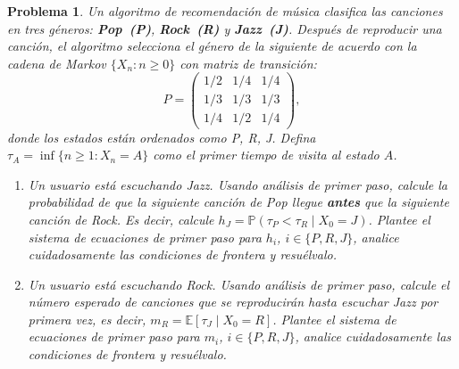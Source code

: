 \documentclass[12pt]{article}
\newtheorem{problem}{Problema}
\begin{document}

\begin{problem}
Un algoritmo de recomendación de música clasifica las canciones en tres géneros:
\textbf{Pop~(P)}, \textbf{Rock~(R)} y \textbf{Jazz~(J)}. Después de reproducir una canción,
el algoritmo selecciona el género de la siguiente de acuerdo con la cadena de Markov
$\{X_n : n \geq 0\}$ con matriz de transición:
\[
P = \begin{pmatrix}
1/2 & 1/4 & 1/4 \\[4pt]
1/3 & 1/3 & 1/3 \\[4pt]
1/4 & 1/2 & 1/4
\end{pmatrix},
\]
donde los estados están ordenados como P, R, J.
Defina $\tau_A = \inf\{n \geq 1 : X_n = A\}$ como el primer tiempo de visita al estado $A$.
\begin{enumerate}
    \item[(a)] Un usuario está escuchando Jazz. Usando análisis de primer paso, calcule la probabilidad
        de que la siguiente canción de Pop llegue \textbf{antes} que la siguiente canción de Rock.
        Es decir, calcule $h_J = \mathbb{P}(\tau_P < \tau_R \mid X_0 = J)$.
        Plantee el sistema de ecuaciones de primer paso para $h_i$, $i \in \{P, R, J\}$, analice cuidadosamente las condiciones de frontera y resuélvalo.

    \item[(b)] Un usuario está escuchando Rock. Usando análisis de primer paso, calcule el número
        esperado de canciones que se reproducirán hasta escuchar Jazz por primera vez,
        es decir, $m_R = \mathbb{E}[\tau_J \mid X_0 = R]$.
        Plantee el sistema de ecuaciones de primer paso para $m_i$, $i \in \{P, R, J\}$, analice cuidadosamente las condiciones de frontera y resuélvalo.
\end{enumerate}
\end{problem}
\end{document}
